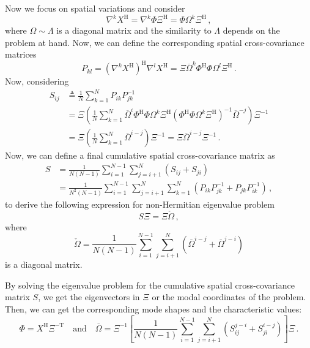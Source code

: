 \documentclass[10pt]{article}
\begin{document}
Now we focus on spatial variations and consider
\begin{equation}
    \nabla^k X^\mathrm{H} = \nabla^k \Phi \Xi ^\mathrm{H}  = \Phi \Omega^k \Xi ^\mathrm{H}\,, 
\end{equation}
where $\Omega \sim \Lambda$ is a diagonal matrix and the similarity to $\Lambda$ depends on the problem at hand.
Now, we can define the corresponding spatial cross-covariance matrices
\begin{equation}
    P_{kl} = \left({\nabla}^k X^\mathrm{H}\right)^\mathrm{H} {\nabla}^l X^\mathrm{H} = \Xi \overline \Omega^k \Phi^\mathrm{H}  \Phi \Omega^l \Xi^\mathrm{H}\,.
\end{equation}
Now, considering
\begin{align}
    S_{ij} &\triangleq \frac{1}{N}\sum_{k=1}^N P_{ik}P_{jk}^{-1}\\ 
    &= \Xi \left(\frac{1}{N}\sum_{k=1}^N \overline \Omega^i \Phi^\mathrm{H} \Phi \Omega^k \Xi^\mathrm{H} \left( \Phi^\mathrm{H}\Phi \Omega^k \Xi^\mathrm{H}\right)^{-1}\overline \Omega^{-j}\right)\Xi^{-1}\\
    &= \Xi \left(\frac{1}{N}\sum_{k=1}^N  \overline \Omega^{i-j} \right) \Xi^{-1} = \Xi \overline \Omega^{i-j} \Xi^{-1}\,.
\end{align}
Now, we can define a final cumulative spatial cross-covariance matrix as
\begin{equation}
\begin{aligned}
    S &= \frac{1}{N(N-1)}\sum_{i=1}^{N-1} \sum_{j=i+1}^N \left(S_{ij} + S_{ji}\right)\\
    &= \frac{1}{N^2(N-1)}\sum_{i=1}^{N-1} \sum_{j=i+1}^N \sum_{k=1}^N \left(P_{ik} P_{jk}^{-1} + P_{jk} P_{ik}^{-1}\right)\,,
\end{aligned}
\end{equation}
to derive the following expression for non-Hermitian eigenvalue problem
\begin{equation}
    S\Xi = \Xi \check  \Omega \,,
\end{equation}
where
\begin{equation}
        \check  \Omega = \frac{1}{N(N-1)}\sum_{i=1}^{N-1} \sum_{j=i+1}^N \left( \overline\Omega^{i-j} + \overline\Omega^{j-i} \right)
\end{equation}
is a diagonal matrix.

By solving the eigenvalue problem for the cumulative spatial cross-covariance matrix $S$, we get the eigenvectors in $\Xi$ or the modal coordinates of the problem.
Then, we can get the corresponding mode shapes and the characteristic values:
\begin{equation}
    \Phi = X^\mathrm{H} \Xi^\mathrm{-T} \quad \mathrm{and} \quad \overline\Omega = \Xi^{-1}\left[\frac{1}{N(N-1)}\sum_{i=1}^{N-1} \sum_{j=i+1}^N \left(S_{ij}^{j-i}+S_{ji}^{i-j}\right)\right] \Xi\,.
\end{equation}
\end{document}
